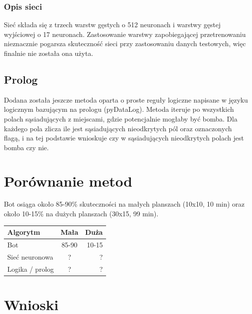 \documentclass[letterpaper,12pt]{article} %
\begin{document}
\subsubsection*{Opis sieci}
Sieć składa się z trzech warstw gęstych o 512 neuronach i warstwy gęstej wyjściowej o 17 neuronach. Zastosowanie warstwy zapobiegającej przetrenowaniu nieznacznie pogarsza skuteczność sieci przy zastosowaniu danych testowych, 
więc finalnie nie została ona użyta.
\subsection{Prolog}
Dodana została jeszcze metoda oparta o proste reguły logiczne napisane w języku logicznym bazującym na prologu (pyDataLog).
Metoda iteruje po wszystkich polach sąsiadujących z miejscami, gdzie potencjalnie mogłaby być bomba.
Dla każdego pola zlicza ile jest sąsiadujących nieodkrytych pól oraz oznaczonych flagą, i na tej podstawie wnioskuje czy w sąsiadujących nieodkrytych polach jest bomba czy nie.

\section{Porównanie metod}
Bot osiąga około 85-90\% skuteczności na małych planszach (10x10, 10 min) 
oraz około 10-15\% na dużych planszach (30x15, 99 min).
\begin{center} 
    \begin{tabular}  { | l | c | r |   }
        \hline
        Algorytm & Mała & Duża  \\
        \hline
        Bot & 85-90 & 10-15 \\
        \hline
        Sieć neuronowa & ? & ? \\
        \hline
        Logika / prolog & ? & ? \\
        \hline
    \end{tabular}
\end{center}
\section{Wnioski}
\end{document}
